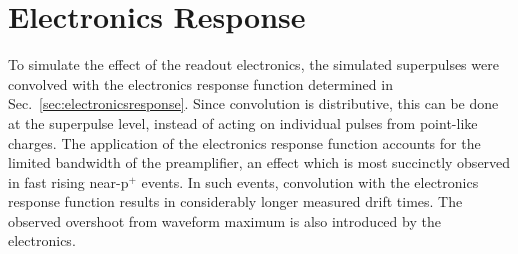 \section{Electronics Response}\label{sec:electronicsanalytical}

To simulate the effect of the readout electronics, the simulated superpulses were convolved with the electronics response function determined in Sec.~\ref{sec:electronicsresponse}. Since convolution is distributive, this can be done at the superpulse level, instead of acting on individual pulses from point-like charges. The application of the electronics response function accounts for the limited bandwidth of the preamplifier, an effect which is most succinctly observed in fast rising near-p$^+$ events. In such events, convolution with the electronics response function results in considerably longer measured drift times. The observed overshoot from waveform maximum is also introduced by the electronics. 

